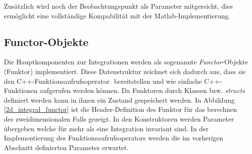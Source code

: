 Zusätzlich wird noch der Beobachtungspunkt als Parameter mitgereicht, dies ermöglicht eine vollständige Kompabilität mit der Matlab-Implementierung.

\subsection{Functor-Objekte}\label{sec_functor}

Die Hauptkomponenten zur Integrationen werden als sogenannte \textit{Functor}-Objekte (Funktor) implementiert.
Diese Datenstruktur zeichnet sich dadurch aus, dass sie den C++-Funktionsaufrufsoperator \textit{\(\)} bereitstellen und wie einfache C++-Funktionen aufgerufen werden können.
Da Funktoren durch Klassen bzw. \textit{structs} definiert werden kann in ihnen ein Zustand gespeichert werden.
In Abbildung \ref{2d_integral_functor} ist die Header-Definition des Funktor für das berechnen des zweidimensionalen Falls gezeigt.
In den Konstruktoren werden Parameter übergeben welche für mehr als eine Integration invariant sind. In der Implementierung des Funktionsaufrufsoperators werden die im vorherigen Abschnitt definierten Parameter erwartet.

\begin{center}
    
    \label{2d_integral_functor}
\end{center}